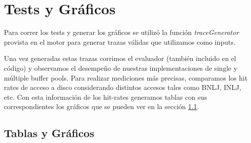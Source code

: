 \section{Tests y Gráficos}
Para correr los tests y generar los gráficos se utilizó la función \textit{traceGenerator} provista en el motor para generar trazas válidas que utilizamos como inputs. 

Una vez generadas estas trazas corrimos el evaluador (también incluido en el código) y observamos el desempeño de nuestras implementaciones de single y múltiple buffer pools. Para realizar mediciones más precisas, comparamos los hit rates de acceso a disco considerando distintos accesos tales como BNLJ, INLJ, etc. Con esta información de los hit-rates generamos tablas con sus correspondientes los gráficos que se pueden ver en la sección \ref{secTablasYGraficos}.


\subsection{Tablas y Gráficos}\label{secTablasYGraficos}